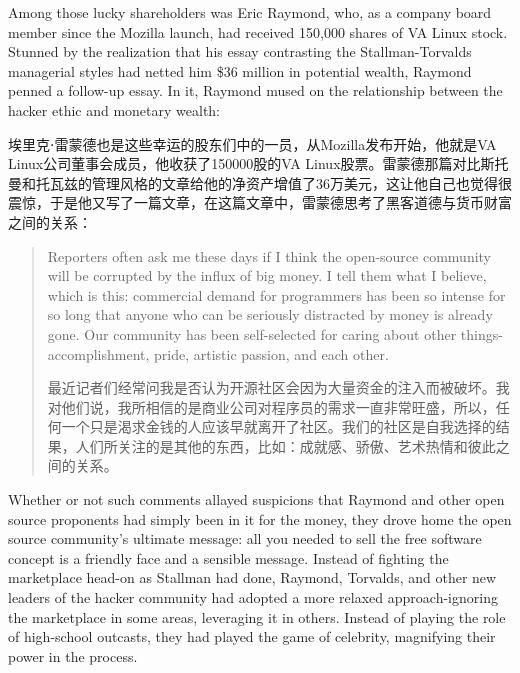 \ifdefined\eng
Among those lucky shareholders was Eric Raymond, who, as a company board member since the Mozilla launch, had received 150,000 shares of VA Linux stock. Stunned by the realization that his essay contrasting the Stallman-Torvalds managerial styles had netted him \$36 million in potential wealth, Raymond penned a follow-up essay. In it, Raymond mused on the relationship between the hacker ethic and monetary wealth:
\fi

\ifdefined\chs
埃里克⋅雷蒙德也是这些幸运的股东们中的一员，从Mozilla发布开始，他就是VA Linux公司董事会成员，他收获了150000股的VA Linux股票。雷蒙德那篇对比斯托曼和托瓦兹的管理风格的文章给他的净资产增值了36万美元，这让他自己也觉得很震惊，于是他又写了一篇文章，在这篇文章中，雷蒙德思考了黑客道德与货币财富之间的关系：
\fi

\begin{quote}
\ifdefined\eng
Reporters often ask me these days if I think the open-source community will be corrupted by the influx of big money. I tell them what I believe, which is this: commercial demand for programmers has been so intense for so long that anyone who can be seriously distracted by money is already gone. Our community has been self-selected for caring about other things-accomplishment, pride, artistic passion, and each other.
\fi

\ifdefined\chs
最近记者们经常问我是否认为开源社区会因为大量资金的注入而被破坏。我对他们说，我所相信的是商业公司对程序员的需求一直非常旺盛，所以，任何一个只是渴求金钱的人应该早就离开了社区。我们的社区是自我选择的结果，人们所关注的是其他的东西，比如：成就感、骄傲、艺术热情和彼此之间的关系。
\fi
\end{quote}

\ifdefined\eng
Whether or not such comments allayed suspicions that Raymond and other open source proponents had simply been in it for the money, they drove home the open source community's ultimate message: all you needed to sell the free software concept is a friendly face and a sensible message. Instead of fighting the marketplace head-on as Stallman had done, Raymond, Torvalds, and other new leaders of the hacker community had adopted a more relaxed approach-ignoring the marketplace in some areas, leveraging it in others. Instead of playing the role of high-school outcasts, they had played the game of celebrity, magnifying their power in the process.
\fi

